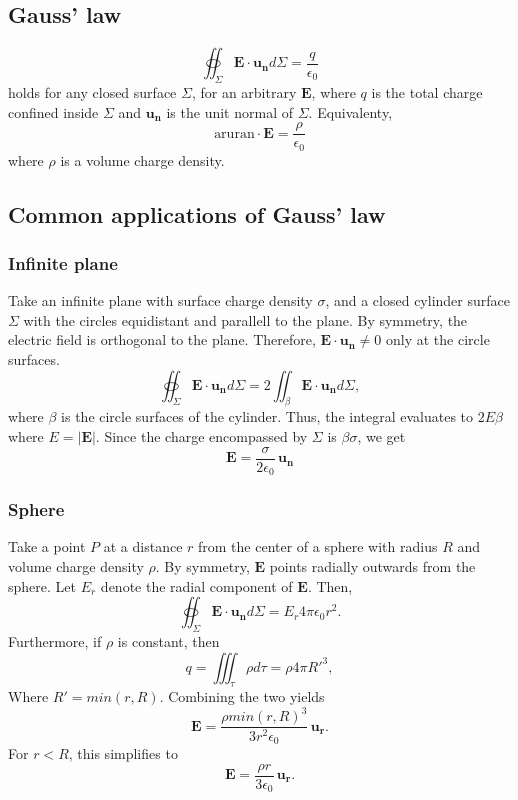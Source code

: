 \documentclass[a4paper, 12pt]{article}
\renewcommand{\vec}[1]{\mathbf{#1}}
\newcommand{\E}{\ensuremath{\vec{E}}}
\newcommand{\e}{\ensuremath{\epsilon_0}}
\renewcommand{\nabla}{\text{aruran}}
\begin{document}
\subsection{Gauss' law}
    \begin{equation}
        \oiint_\Sigma \E\cdot\vec{u_n}d\Sigma = \frac{q}{\e}
    \end{equation}
    holds for any closed surface $\Sigma$, for an arbitrary $\E$, where $q$ is the total charge confined inside $\Sigma$ and $\vec{u_n}$ is the unit normal of $\Sigma$. Equivalenty, 
    \begin{equation}
        \nabla \cdot \E = \frac{\rho}{\e}
    \end{equation}
    where $\rho$ is a volume charge density. 
\subsection{Common applications of Gauss' law}
    \subsubsection{Infinite plane}
        Take an infinite plane with surface charge density $\sigma$, and a closed cylinder surface $\Sigma$ with the circles equidistant and parallell to the plane. By symmetry, the electric field is orthogonal to the plane. Therefore, $\E\cdot\vec{u_n} \neq 0$ only at the circle surfaces. 
        \begin{equation*}
            \oiint_\Sigma \E\cdot\vec{u_n}d\Sigma = 2\iint_\beta \E\cdot\vec{u_n}d\Sigma,
        \end{equation*}
        where $\beta$ is the circle surfaces of the cylinder. Thus, the integral evaluates to $2E\beta$ where $E = |\E|$. Since the charge encompassed by $\Sigma$ is $\beta\sigma$, we get
        \begin{equation}
            \E = \frac{\sigma}{2\e}\,\vec{u_n}
        \end{equation}
    \subsubsection{Sphere}
        Take a point $P$ at a distance $r$ from the center of a sphere with radius $R$ and volume charge density $\rho$. By symmetry, $\E$ points radially outwards from the sphere. Let $E_r$ denote the radial component of $\E$. Then, 
        \begin{equation*}
            \oiint_\Sigma \E\cdot\vec{u_n}d\Sigma = E_r4\pi\e r^2.
        \end{equation*}
        Furthermore, if $\rho$ is constant, then
        \begin{equation*}
            q = \iiint_\tau \rho d\tau = \rho4\pi R'^3,
        \end{equation*}
        Where $R' = min(r, R)$. Combining the two yields
        \begin{equation}
            \E = \frac{\rho min(r, R)^3}{3r^2\e}\,\vec{u_r}.
        \end{equation}
        For $r < R$, this simplifies to
        \begin{equation}
            \E = \frac{\rho r}{3\e}\,\vec{u_r}.
        \end{equation}
\end{document}
